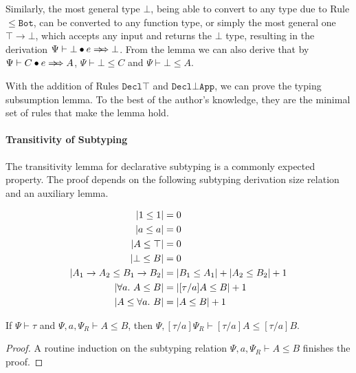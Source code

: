 Similarly, the most general type $\bot$,
being able to convert to any type due to Rule $\mathtt{{\le}Bot}$,
can be converted to any function type,
or simply the most general one $\top \to \bot$,
which accepts any input and returns the $\bot$ type,
resulting in the derivation $\Psi \vdash \appInf{\bot}{e}{\bot}$.
From the lemma we can also derive that by
$\Psi \vdash \appInf{C}{e}{A}$, $\Psi \vdash \bot \le C$ and $\Psi \vdash \bot \le A$.

With the addition of Rules $\mathtt{Decl\top}$ and $\mathtt{Decl{\bot}App}$,
we can prove the typing subsumption lemma.
To the best of the author's knowledge,
they are the minimal set of rules that make the lemma hold.


\paragraph{Transitivity of Subtyping}

The transitivity lemma for declarative subtyping is a commonly expected property.
The proof depends on the following subtyping derivation size relation and an auxiliary lemma.

\begin{definition}
    \begin{gather*}
        \begin{aligned}
            |1 \le 1| &= 0\\
            |a \le a| &= 0\\
            |A \le \top| &= 0\\
            |\bot \le B| &= 0\\
            |A_1 \to A_2 \le B_1 \to B_2| &= |B_1 \le A_1| + |A_2 \le B_2| + 1\\
            |\all A \le B| &= |[\tau/a]A \le B| + 1\\
            |A \le \all B| &= |A \le B| + 1
        \end{aligned}
    \end{gather*}
\end{definition}

\begin{lemma}
    If $\Psi \vdash \tau$ and $\Psi, a, \Psi_R \vdash A \le B$, then
    $\Psi, [\tau/a]\Psi_R \vdash [\tau/a]A \le [\tau/a]B$.
\end{lemma}

\begin{proof}
    A routine induction on the subtyping relation $\Psi, a, \Psi_R \vdash A \le B$
    finishes the proof.
\end{proof}

